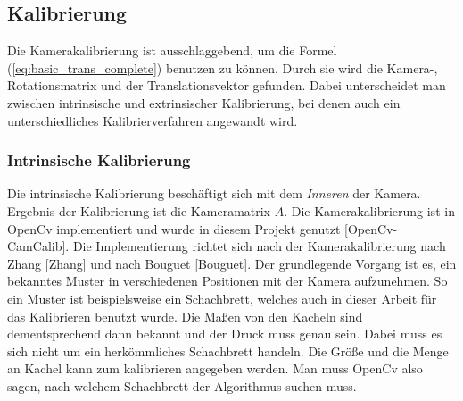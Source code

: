 	\newpage
		
	\subsection{Kalibrierung}
		Die Kamerakalibrierung ist ausschlaggebend, um die Formel (\ref{eq:basic_trans_complete}) benutzen zu können. Durch sie wird die Kamera-, Rotationsmatrix und der Translationsvektor gefunden. Dabei unterscheidet man zwischen intrinsische und extrinsischer Kalibrierung, bei denen auch ein unterschiedliches Kalibrierverfahren angewandt wird.
		
		\label{chap:kalibierung}
		\subsubsection{Intrinsische Kalibrierung}
		Die intrinsische Kalibrierung beschäftigt sich mit dem \textit{Inneren} der Kamera. Ergebnis der Kalibrierung ist die Kameramatrix \( A \). Die Kamerakalibrierung ist in OpenCv implementiert und wurde in diesem Projekt genutzt [OpenCv-CamCalib]. Die Implementierung richtet sich nach der Kamerakalibrierung nach Zhang [Zhang] und nach Bouguet [Bouguet]. \newline
		Der grundlegende Vorgang ist es, ein bekanntes Muster in verschiedenen Positionen mit der Kamera aufzunehmen. So ein Muster ist beispielsweise ein Schachbrett, welches auch in dieser Arbeit für das Kalibrieren benutzt wurde. Die Maßen von den Kacheln sind dementsprechend dann bekannt und der Druck muss genau sein. Dabei muss es sich nicht um ein herkömmliches Schachbrett handeln. Die Größe und die Menge an Kachel kann zum kalibrieren angegeben werden. Man muss OpenCv also sagen, nach welchem Schachbrett der Algorithmus suchen muss.
		
